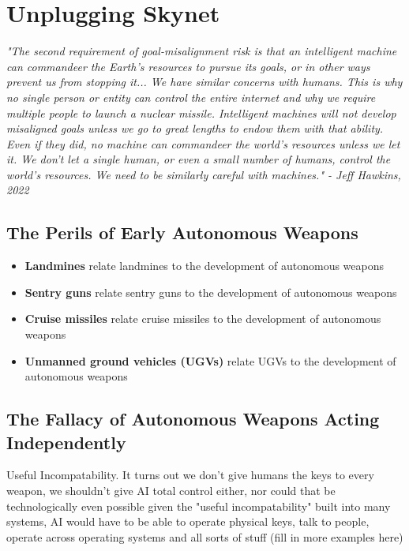 \setchapterpreamble[u]{\margintoc}
\chapter{Unplugging Skynet}

\textit{"The second requirement of goal-misalignment risk is that an intelligent machine can commandeer the Earth's resources to pursue its goals, or in other ways prevent us from stopping it... We have similar concerns with humans. This is why no single person or entity can control the entire internet and why we require multiple people to launch a nuclear missile. Intelligent machines will not develop misaligned goals unless we go to great lengths to endow them with that ability. Even if they did, no machine can commandeer the world's resources unless we let it. We don't let a single human, or even a small number of humans, control the world's resources. We need to be similarly careful with machines." - Jeff Hawkins, 2022 \cite{hawkins2022}}

\section{The Perils of Early Autonomous Weapons}
\begin{itemize}
    \item \textbf{Landmines} relate landmines to the development of autonomous weapons
    \item \textbf{Sentry guns} relate sentry guns to the development of autonomous weapons
    \item \textbf{Cruise missiles} relate cruise missiles to the development of autonomous weapons
    \item \textbf{Unmanned ground vehicles (UGVs)} relate UGVs to the development of autonomous weapons
\end{itemize}

\section{The Fallacy of Autonomous Weapons Acting Independently}

Useful Incompatability. It turns out we don't give humans the keys to every weapon, we shouldn't give AI total control either, nor could that be technologically even possible given the "useful incompatability" built into many systems, AI would have to be able to operate physical keys, talk to people, operate across operating systems and all sorts of stuff (fill in more examples here)

